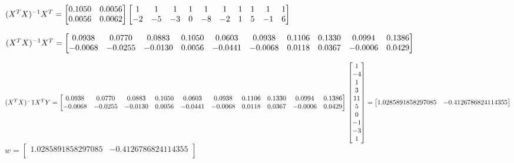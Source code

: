 \documentclass[12pt]{article}
\begin{document}
\hfill \break
\hfill \break

\noindent $(X^TX)^{-1}X^T = 
\begin{bmatrix}0.1050 & 0.0056\\ 0.0056 & 0.0062\end{bmatrix}
\begin{bmatrix}
1 & 1 & 1 & 1 & 1 & 1 & 1 & 1 & 1 & 1\\
-2 & -5 & -3 & 0 & -8 & -2 & 1 & 5 & -1 & 6
\end{bmatrix}\\
$
\hfill \break
\hfill \break

\noindent $(X^TX)^{-1}X^T =
\hfill \break
\hfill \break
\begin{bmatrix}
0.0938 & 0.0770 & 0.0883 & 0.1050 & 0.0603 & 0.0938 & 0.1106 & 0.1330 & 0.0994 & 0.1386\\
-0.0068 & -0.0255 & -0.0130 & 0.0056 & -0.0441 & -0.0068 & 0.0118 & 0.0367 & -0.0006 & 0.0429
\end{bmatrix}\\
$
\hfill \break
\hfill \break

\noindent $(X^TX)^-1X^TY = 
\hfill \break
\hfill \break
\begin{bmatrix}
0.0938 & 0.0770 & 0.0883 & 0.1050 & 0.0603 & 0.0938 & 0.1106 & 0.1330 & 0.0994 & 0.1386\\
-0.0068 & -0.0255 & -0.0130 & 0.0056 & -0.0441 & -0.0068 & 0.0118 & 0.0367 & -0.0006 & 0.0429
\end{bmatrix}\\
\hfill \break
\hfill \break
\begin{bmatrix}
	1\\
	-4\\	
	1\\
	3\\
	11\\
	5\\
	0\\
	-1\\
	-3\\
	1\\
\end{bmatrix}
= 
\begin{bmatrix}	1.0285891858297085 & -0.4126786824114355 \\\end{bmatrix}$
\\
\hfill \break
\hfill \break
$w = \begin{bmatrix}	1.0285891858297085 & -0.4126786824114355 \\\end{bmatrix}$
\\
\end{document}
